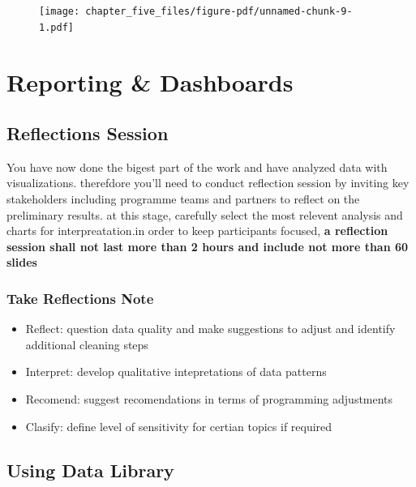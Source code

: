 \documentclass[
  letterpaper,
  DIV=11,
  numbers=noendperiod]{scrreprt}
\providecommand{\tightlist}{%
  \setlength{\itemsep}{0pt}\setlength{\parskip}{0pt}}\usepackage{longtable,booktabs,array}
\begin{document}
\begin{figure}[H]

{\centering \texttt{[image: chapter\_five\_files/figure-pdf/unnamed-chunk-9-1.pdf]}

}

\end{figure}


\hypertarget{reporting-dashboards}{%
\chapter{Reporting \& Dashboards}\label{reporting-dashboards}}

\hypertarget{reflections-session}{%
\section{Reflections Session}\label{reflections-session}}

You have now done the bigest part of the work and have analyzed data
with visualizations. therefdore you'll need to conduct reflection
session by inviting key stakeholders including programme teams and
partners to reflect on the preliminary results. at this stage, carefully
select the most relevent analysis and charts for interpreatation.in
order to keep participants focused, \textbf{a reflection session shall
not last more than 2 hours and include not more than 60 slides}

\hypertarget{take-reflections-note}{%
\subsection{Take Reflections Note}\label{take-reflections-note}}

\begin{itemize}
\tightlist
\item
  Reflect: question data quality and make suggestions to adjust and
  identify additional cleaning steps
\item
  Interpret: develop qualitative intepretations of data patterns
\item
  Recomend: suggest recomendations in terms of programming adjustments
\item
  Clasify: define level of sensitivity for certian topics if required
\end{itemize}

\hypertarget{using-data-library}{%
\section{Using Data Library}\label{using-data-library}}
\end{document}
